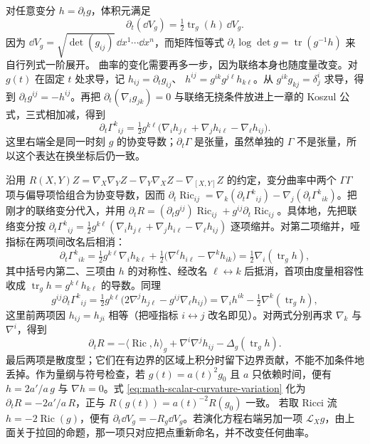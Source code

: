 对任意变分 \(h=\partial_tg\)，体积元满足
\[
\partial_t(\dd V_g)=\tfrac12\operatorname{tr}_g(h)\,\dd V_g.
\]
因为 \(\dd V_g=\sqrt{\det(g_{ij})}\,\dd x^1\cdots \dd x^n\)，而矩阵恒等式
\(\partial_t\log\det g=\operatorname{tr}(g^{-1}h)\) 来自行列式一阶展开。
曲率的变化需要再多一步，因为联络本身也随度量改变。对
\(g(t)\) 在固定 \(t\) 处求导，记 \(h_{ij}=\partial_tg_{ij}\)、
\(h^{ij}=g^{ik}g^{j\ell}h_{k\ell}\)。从
\(g^{ik}g_{kj}=\delta^i_j\) 求导，得到
\(\partial_tg^{ij}=-h^{ij}\)。再把
\(\partial_t(\nabla_i g_{jk})=0\) 与联络无挠条件放进上一章的
Koszul 公式，三式相加减，得到
\[
\partial_t\Gamma^k{}_{ij}
=\tfrac12g^{k\ell}
\bigl(\nabla_i h_{j\ell}+\nabla_j h_{i\ell}-\nabla_\ell h_{ij}\bigr).
\]
这里右端全是同一时刻 \(g\) 的协变导数；\(\partial_t\Gamma\) 是张量，虽然单独的 \(\Gamma\) 不是张量，所以这个表达在换坐标后仍一致。

沿用 \(R(X,Y)Z=\nabla_X\nabla_YZ-\nabla_Y\nabla_XZ-\nabla_{[X,Y]}Z\) 的约定，变分曲率中两个 \(\Gamma\Gamma\) 项与偏导项恰组合为协变导数，因而
\(\partial_t\operatorname{Ric}_{ij}
=\nabla_k(\partial_t\Gamma^k{}_{ij})
-\nabla_j(\partial_t\Gamma^k{}_{ik})\)。把刚才的联络变分代入，并用
\(\partial_tR=(\partial_tg^{ij})\operatorname{Ric}_{ij}
+g^{ij}\partial_t\operatorname{Ric}_{ij}\)。具体地，先把联络变分按
\(\partial_t\Gamma^k{}_{ij}
=\tfrac12g^{k\ell}(\nabla_i h_{j\ell}
+\nabla_j h_{i\ell}-\nabla_\ell h_{ij})\)
逐项缩并。对第二项缩并，哑指标在两项间改名后相消：
\[
\partial_t\Gamma^k{}_{ik}
=\tfrac12g^{k\ell}\nabla_i h_{k\ell}
+\tfrac12\bigl(\nabla^\ell h_{i\ell}-\nabla^k h_{ik}\bigr)
=\tfrac12\nabla_i(\operatorname{tr}_g h),
\]
其中括号内第二、三项由 \(h\) 的对称性、经改名
\(\ell\leftrightarrow k\) 后抵消，首项由度量相容性收成
\(\operatorname{tr}_g h=g^{k\ell}h_{k\ell}\) 的导数。同理
\[
g^{ij}\partial_t\Gamma^k{}_{ij}
=\tfrac12g^{k\ell}\bigl(2\nabla^j h_{j\ell}
-g^{ij}\nabla_\ell h_{ij}\bigr)
=\nabla_i h^{ik}-\tfrac12\nabla^k(\operatorname{tr}_g h),
\]
这里前两项因 \(h_{ij}=h_{ji}\) 相等（把哑指标
\(i\leftrightarrow j\) 改名即见）。对两式分别再求
\(\nabla_k\) 与 \(\nabla^i\)，得到
\begin{equation}
\label{eq:math-scalar-curvature-variation}
\partial_tR
=-\langle\operatorname{Ric},h\rangle_g
+\nabla^i\nabla^j h_{ij}-\Delta_g(\operatorname{tr}_g h).
\end{equation}
最后两项是散度型；它们在有边界的区域上积分时留下边界贡献，不能不加条件地丢掉。作为量纲与符号检查，若 \(g(t)=a(t)^2g_0\) 且 \(a\) 只依赖时间，便有 \(h=2a'/a\,g\) 与 \(\nabla h=0\)。式 \cref{eq:math-scalar-curvature-variation} 化为
\(\partial_tR=-2a'/a\,R\)，正与 \(R(g(t))=a(t)^{-2}R(g_0)\) 一致。
若取 Ricci 流 \(h=-2\operatorname{Ric}(g)\)，便有
\(\partial_t \dd V_g=-R_g\dd V_g\)。若演化方程右端另加一项
\(\mathcal L_Xg\)，由上面关于拉回的命题，那一项只对应把点重新命名，并不改变任何曲率。

